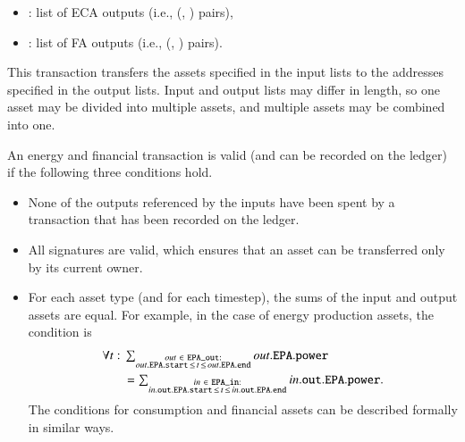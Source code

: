 \begin{itemize}[noitemsep,topsep=-\parskip]
\begin{itemize}[leftmargin=0.5em,nosep]
\end{itemize}
\item {}: list of ECA outputs (i.e., (, ) pairs), %
\item {}: list of FA outputs (i.e., (, ) pairs). %
\end{itemize}
\vspace{0.5\parskip} This transaction transfers the assets specified
in the input lists to the addresses specified in the output lists.
Input and output lists may differ in length, so one asset may be
divided into multiple assets, and multiple assets may be combined into
one.

An energy and financial transaction is valid (and can be recorded on
the ledger) if the following three conditions hold.
\begin{itemize}[noitemsep,topsep=-\parskip]
\item None of the outputs referenced by the inputs have been spent by
  a transaction that has been recorded on the ledger.
\item All signatures are valid, which ensures that an asset can be
  transferred only by its current owner. 
\item For each asset type (and for each timestep), the sums of the
input and output assets are equal.  For example, in the case of
energy production assets, the condition is
\begin{align*}
 \forall t: ~ & \textstyle \sum_{\substack{out ~ \in ~ \texttt{EPA\_out}:\\out.\texttt{EPA}.\texttt{start} \, \leq \, t \, \leq \, out.\texttt{EPA}.\texttt{end}}} out.\texttt{EPA}.\texttt{power} \nonumber \\
 & \textstyle = \sum_{\substack{in ~ \in ~ \texttt{EPA\_in}:\\in.\texttt{out}.\texttt{EPA}.\texttt{start} \, \leq \, t \, \leq \, in.\texttt{out}.\texttt{EPA}.\texttt{end}}} in.\texttt{out}.\texttt{EPA}.\texttt{power}  .
\end{align*}
The conditions for consumption and financial assets can be described
formally in similar ways.
\end{itemize}

